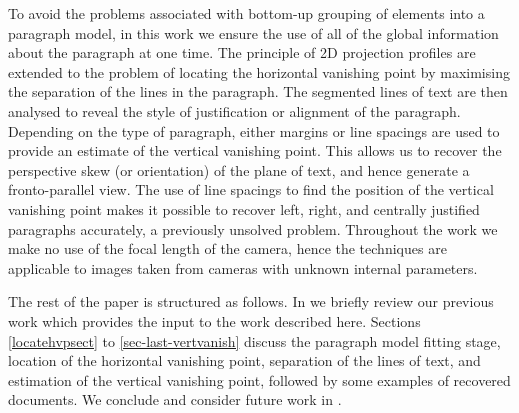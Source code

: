 \documentclass{article}
\begin{document}
To avoid the problems associated with bottom-up grouping of elements into
a paragraph model, in this work we ensure the use of all of
the global information about the paragraph at one time.
The principle of 2D projection profiles are extended to the
problem of locating the horizontal vanishing point by maximising the
separation of the lines in the paragraph.
The segmented lines of text are then analysed to reveal the
style of justification or alignment of the paragraph.
Depending on the type of paragraph, either margins or line spacings
are used to provide an estimate of the vertical vanishing point.
This allows us to recover the perspective skew (or orientation) of the plane of text, and hence generate a fronto-parallel view.
The use of line spacings to find the position of the vertical vanishing point makes it possible to recover left, right, and centrally justified paragraphs accurately, a previously unsolved problem.
Throughout the work we make no use of the focal length of the camera, hence the techniques are applicable to images taken from cameras with unknown internal parameters.



The rest of the paper is structured as follows.  In 
we briefly review our previous work which provides the input to the work
described here.  Sections \ref{locatehvpsect} to \ref{sec-last-vertvanish} discuss
the paragraph model fitting stage, location of the horizontal vanishing point,
separation of the lines of text, and estimation of the vertical vanishing point, followed by some examples of recovered documents.
We conclude and consider future work in .
\end{document}
